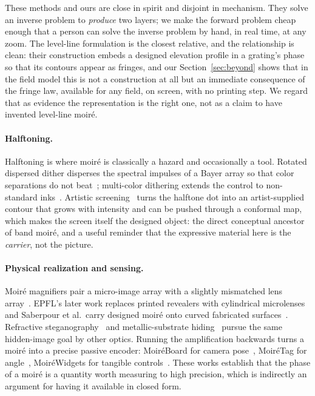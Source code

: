 These methods and ours are close in spirit and disjoint in mechanism. They solve
an inverse problem to \emph{produce} two layers; we make the forward problem cheap
enough that a person can solve the inverse problem by hand, in real time, at any
zoom. The level-line formulation is the closest relative, and the relationship is
clean: their construction embeds a designed elevation profile in a grating's phase
so that its contours appear as fringes, and our Section~\ref{sec:beyond} shows
that in the field model this is not a construction at all but an immediate
consequence of the fringe law, available for any field, on screen, with no printing
step. We regard that as evidence the representation is the right one, not as a
claim to have invented level-line moir\'e.

\paragraph{Halftoning.}
Halftoning is where moir\'e is classically a hazard and occasionally a tool.
Rotated dispersed dither disperses the spectral impulses of a Bayer array so that
color separations do not beat~\cite{Ostromoukhov1994Rotated, Ulichney1987};
multi-color dithering extends the control to non-standard
inks~\cite{Ostromoukhov1999MultiColor}. Artistic
screening~\cite{Ostromoukhov1995Artistic} turns the halftone dot into an
artist-supplied contour that grows with intensity and can be pushed through a
conformal map, which makes the screen itself the designed object: the direct
conceptual ancestor of band moir\'e, and a useful reminder that the expressive
material here is the \emph{carrier}, not the picture.

\paragraph{Physical realization and sensing.}
Moir\'e magnifiers pair a micro-image array with a slightly mismatched lens
array~\cite{Hutley1994Moire}. EPFL's later work replaces printed revealers with
cylindrical microlenses~\cite{Walger2019Moire, Walger2020LevelLine} and Saberpour
et al.\ carry designed moir\'e onto curved fabricated
surfaces~\cite{Saberpour2020Fabrication}. Refractive
steganography~\cite{Papas2012Magic} and metallic-substrate
hiding~\cite{Pjanic2015Color} pursue the same hidden-image goal by other optics.
Running the amplification backwards turns a moir\'e into a precise passive
encoder: MoiréBoard for camera pose~\cite{Xiao2021MoireBoard}, MoiréTag for
angle~\cite{Qiu2023MoireTag}, MoiréWidgets for tangible
controls~\cite{CamposZamora2024MoireWidgets}. These works establish that the phase
of a moir\'e is a quantity worth measuring to high precision, which is indirectly
an argument for having it available in closed form.

